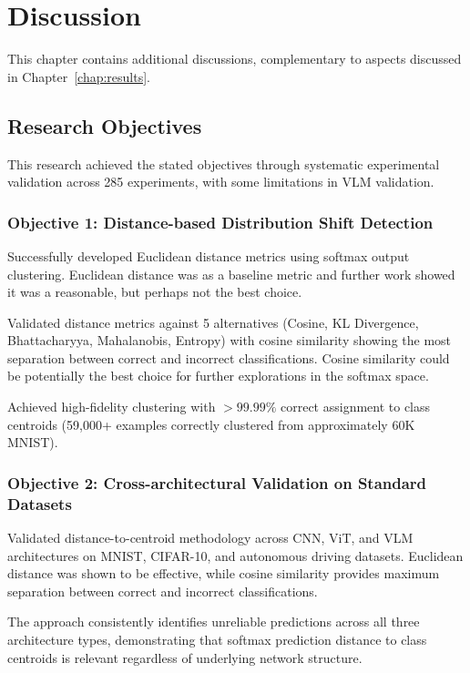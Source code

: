\chapter{Discussion}
\label{chap:discussion}

This chapter contains additional discussions, complementary to aspects discussed in Chapter~\ref{chap:results}.

\section{Research Objectives}

This research achieved the stated objectives through systematic experimental validation across 285 experiments, with some limitations in VLM validation.

\subsection{Objective 1: Distance-based Distribution Shift Detection}

Successfully developed Euclidean distance metrics using softmax output clustering. Euclidean distance was as a baseline metric and further work showed it was a reasonable, but perhaps not the best choice.

Validated distance metrics against 5 alternatives (Cosine, KL Divergence, Bhattacharyya, Mahalanobis, Entropy) with cosine similarity showing the most separation between correct and incorrect classifications. Cosine similarity could be potentially the best choice for further explorations in the softmax space.

Achieved high-fidelity clustering with $>99.99\%$ correct assignment to class centroids (59,000+ examples correctly clustered from approximately 60K MNIST).

\subsection{Objective 2: Cross-architectural Validation on Standard Datasets}

Validated distance-to-centroid methodology across CNN, ViT, and VLM architectures on MNIST, CIFAR-10, and autonomous driving datasets. Euclidean distance was shown to be effective, while cosine similarity provides maximum separation between correct and incorrect classifications.

The approach consistently identifies unreliable predictions across all three architecture types, demonstrating that softmax prediction distance to class centroids is relevant regardless of underlying network structure.

